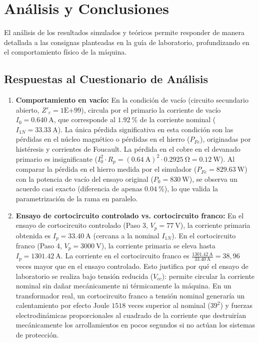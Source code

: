 \chapter{Análisis y Conclusiones}

El análisis de los resultados simulados y teóricos permite responder de manera detallada a las consignas planteadas
en la guía de laboratorio, profundizando en el comportamiento físico de la máquina.

\section{Respuestas al Cuestionario de Análisis}

\begin{enumerate}
    \item \textbf{Comportamiento en vacío:}
    En la condición de vacío (circuito secundario abierto, $Z'_c = 1\text{E+}99$), circula por el primario la corriente
    de vacío $I_0 = \SI{0,640}{\ampere}$, que corresponde al $\SI{1,92}{\percent}$ de la corriente nominal ($I_{1N} = \SI{33,33}{\ampere}$).
    La única pérdida significativa en esta condición son las pérdidas en el núcleo magnético o pérdidas en el hierro ($P_{Fe}$),
    originadas por histéresis y corrientes de Foucault. La pérdida en el cobre en el devanado primario es insignificante
    ($I_0^2 \cdot R_p = (\SI{0,64}{\ampere})^2 \cdot \SI{0,2925}{\ohm} = \SI{0,12}{\watt}$).
    Al comparar la pérdida en el hierro medida por el simulador ($P_{Fe} = \SI{829,63}{\watt}$) con la potencia de vacío del
    ensayo original ($P_0 = \SI{830}{\watt}$), se observa un acuerdo casi exacto (diferencia de apenas $\SI{0,04}{\percent}$),
    lo que valida la parametrización de la rama en paralelo.

    \item \textbf{Ensayo de cortocircuito controlado vs. cortocircuito franco:}
    En el ensayo de cortocircuito controlado (Paso 3, $V_p = \SI{77}{\volt}$), la corriente primaria obtenida es
    $I_p = \SI{33,40}{\ampere}$ (cercana a la nominal $I_{1N}$). En el cortocircuito franco (Paso 4, $V_p = \SI{3000}{\volt}$),
    la corriente primaria se eleva hasta $I_p = \SI{1301,42}{\ampere}$.
    La corriente en el cortocircuito franco es $\frac{\SI{1301,42}{\ampere}}{\SI{33,40}{\ampere}} = 38,96$ veces mayor que en
    el ensayo controlado.
    Esto justifica por qué el ensayo de laboratorio se realiza bajo tensión reducida ($V_{cc}$): permite circular la
    corriente nominal sin dañar mecánicamente ni térmicamente la máquina. En un transformador real, un cortocircuito franco a
    tensión nominal generaría un calentamiento por efecto Joule $1518$ veces superior al nominal ($39^2$) y fuerzas
    electrodinámicas proporcionales al cuadrado de la corriente que destruirían mecánicamente los arrollamientos en pocos
    segundos si no actúan los sistemas de protección.


\end{enumerate}
